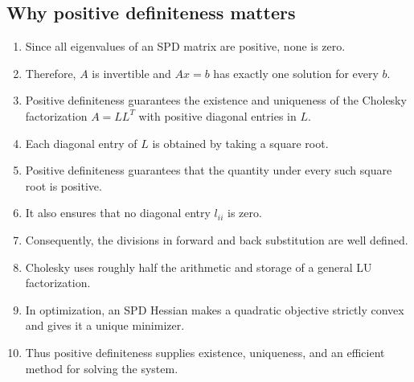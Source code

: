 \documentclass[11pt]{article}
\begin{document}
\subsection{Why positive definiteness matters}
\begin{enumerate}
  \item Since all eigenvalues of an SPD matrix are positive, none is zero.
  \item Therefore, $A$ is invertible and $Ax=b$ has exactly one solution for every $b$.
  \item Positive definiteness guarantees the existence and uniqueness of the Cholesky factorization $A=LL^T$ with positive diagonal entries in $L$.
  \item Each diagonal entry of $L$ is obtained by taking a square root.
  \item Positive definiteness guarantees that the quantity under every such square root is positive.
  \item It also ensures that no diagonal entry $l_{ii}$ is zero.
  \item Consequently, the divisions in forward and back substitution are well defined.
  \item Cholesky uses roughly half the arithmetic and storage of a general LU factorization.
  \item In optimization, an SPD Hessian makes a quadratic objective strictly convex and gives it a unique minimizer.
  \item Thus positive definiteness supplies existence, uniqueness, and an efficient method for solving the system.
\end{enumerate}
\end{document}
